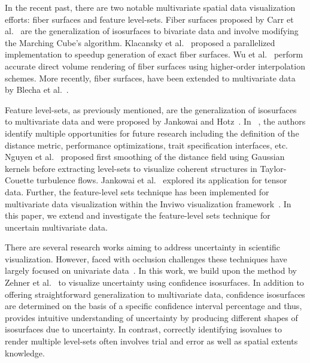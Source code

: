 

In the recent past, there are two notable multivariate spatial data visualization efforts: fiber surfaces and feature level-sets.
%
Fiber surfaces proposed by Carr et al.~\cite{carr2015fiber} are the generalization of isosurfaces to bivariate data and involve modifying the Marching Cube's algorithm.
%
Klacansky et al.~\cite{klacansky2016fast} proposed a parallelized implementation to speedup generation of exact fiber surfaces.
%
Wu et al.~\cite{wu2016direct} perform accurate direct volume rendering of fiber surfaces using higher-order interpolation schemes.
%
More recently, fiber surfaces, have been extended to multivariate data by Blecha et al.~\cite{blecha2020fiber}.
%

Feature level-sets, as previously mentioned, are the generalization of isosurfaces to multivariate data and were proposed by Jankowai and Hotz~\cite{jankowai2020feature}.
%
In ~\cite{jankowai2020feature}, the authors identify multiple opportunities for future research including the definition of the distance metric, performance optimizations, trait specification interfaces, etc.
%
Nguyen et al.~\cite{nguyen2020visualization} proposed first smoothing of the distance field using Gaussian kernels before extracting level-sets to visualize coherent structures in Taylor-Couette turbulence flows.
%
Jankowai et al.~\cite{jankowai2020tensor} explored its application for tensor data. 
%
Further, the feature-level sets technique has been implemented for multivariate data visualization within the Inviwo visualization framework~\cite{jonsson2020inviwo}. 
%
In this paper, we extend and investigate the feature-level sets technique for uncertain multivariate data. 

There are several research works aiming to address uncertainty in scientific visualization.
%
However, faced with occlusion challenges these techniques have largely focused on univariate data~\cite{}.
%
In this work, we build upon the method by Zehner et al.~\cite{zehner2010visualization} to visualize uncertainty using confidence isosurfaces.
%
In addition to offering straightforward generalization to multivariate data, confidence isosurfaces are determined on the basis of a specific confidence interval percentage and thus, provides intuitive understanding of uncertainty by producing different shapes of isosurfaces due to uncertainty. 
%
In contrast, correctly identifying isovalues to render multiple level-sets often involves trial and error as well as spatial extents knowledge. 

